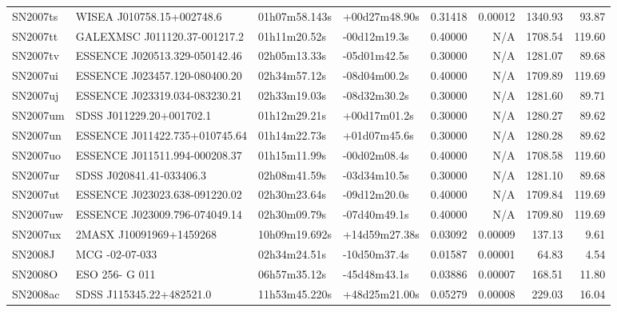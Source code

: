 \begin{longtable}{llllrrrr}
SN2007ts         &       WISEA J010758.15+002748.6 &   01h07m58.143s &   +00d27m48.90s &  0.31418 &  0.00012 &  1340.93 &       93.87 \\
SN2007tt         &  GALEXMSC J011120.37-001217.2   &    01h11m20.52s &    -00d12m19.3s &  0.40000 &      N/A &  1708.54 &      119.60 \\
SN2007tv         &  ESSENCE J020513.329-050142.46  &    02h05m13.33s &    -05d01m42.5s &  0.30000 &      N/A &  1281.07 &       89.68 \\
SN2007ui         &  ESSENCE J023457.120-080400.20  &    02h34m57.12s &    -08d04m00.2s &  0.40000 &      N/A &  1709.89 &      119.69 \\
SN2007uj         &  ESSENCE J023319.034-083230.21  &    02h33m19.03s &    -08d32m30.2s &  0.30000 &      N/A &  1281.60 &       89.71 \\
SN2007um         &        SDSS J011229.20+001702.1 &    01h12m29.21s &    +00d17m01.2s &  0.30000 &      N/A &  1280.27 &       89.62 \\
SN2007un         &  ESSENCE J011422.735+010745.64  &    01h14m22.73s &    +01d07m45.6s &  0.30000 &      N/A &  1280.28 &       89.62 \\
SN2007uo         &  ESSENCE J011511.994-000208.37  &    01h15m11.99s &    -00d02m08.4s &  0.40000 &      N/A &  1708.58 &      119.60 \\
SN2007ur         &        SDSS J020841.41-033406.3 &    02h08m41.59s &    -03d34m10.5s &  0.30000 &      N/A &  1281.10 &       89.68 \\
SN2007ut         &  ESSENCE J023023.638-091220.02  &    02h30m23.64s &    -09d12m20.0s &  0.40000 &      N/A &  1709.84 &      119.69 \\
SN2007uw         &  ESSENCE J023009.796-074049.14  &    02h30m09.79s &    -07d40m49.1s &  0.40000 &      N/A &  1709.80 &      119.69 \\
SN2007ux         &         2MASX J10091969+1459268 &   10h09m19.692s &   +14d59m27.38s &  0.03092 &  0.00009 &   137.13 &        9.61 \\
SN2008J          &                  MCG -02-07-033 &    02h34m24.51s &    -10d50m37.4s &  0.01587 &  0.00001 &    64.83 &        4.54 \\
SN2008O          &                  ESO 256- G 011 &    06h57m35.12s &    -45d48m43.1s &  0.03886 &  0.00007 &   168.51 &       11.80 \\
SN2008ac         &        SDSS J115345.22+482521.0 &   11h53m45.220s &   +48d25m21.00s &  0.05279 &  0.00008 &   229.03 &       16.04 \\

\end{longtable}
